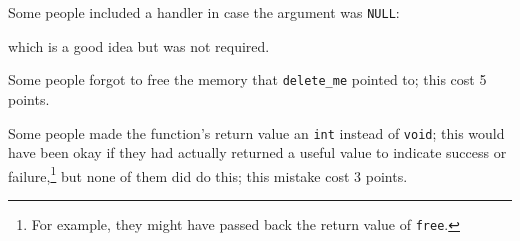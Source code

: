 Some people included a handler in case the argument was {\tt NULL}:

\begin{flushleft}
\verb% if (delete_me == NULL) % \\*
\verb%   return;% 
\end{flushleft}

\noindent which is a good idea but was not required.

Some people forgot to free the memory that {\tt delete\_me} pointed to;
this cost 5 points.  

Some people made the function's return value an {\tt int} instead of
{\tt void}; this would have been okay if they had actually returned a
useful value to indicate success or failure,\footnote{For example, they
might have passed back the return value of {\tt free}.} but none of them
did do this; this mistake cost 3 points.


